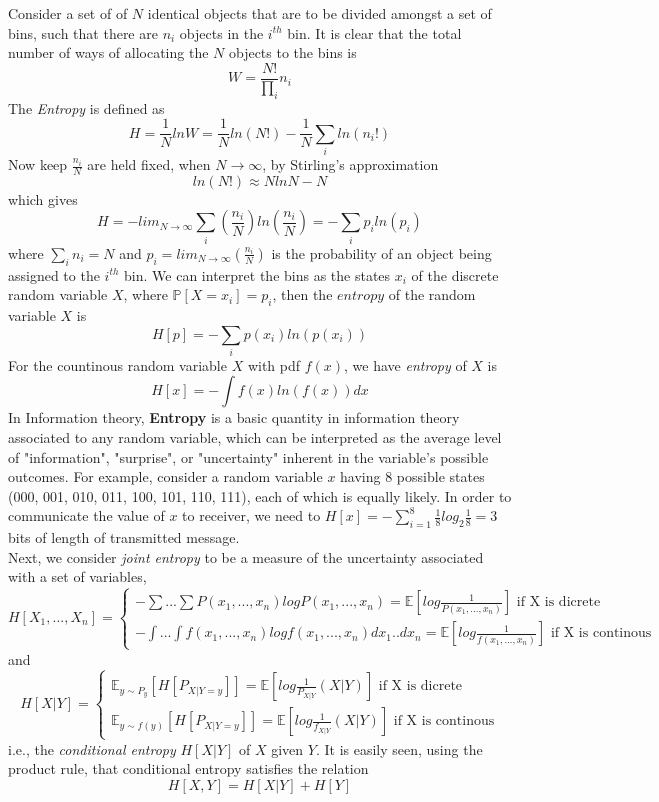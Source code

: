 \documentclass[10pt]{article}
\begin{document}
Consider a set of of $N$ identical objects that are to be divided amongst a set of bins, such that there are $n_i$ objects in the $i^{th}$ bin. It is clear that the total number of ways of allocating the $N$ objects to the bins is
\[ W = \frac{N!}{\prod_{i}}n_i \]
The \textit{Entropy} is defined as
\[ H = \frac{1}{N}lnW = \frac{1}{N}ln(N!) - \frac{1}{N}\sum_{i}ln(n_i!) \]
Now keep $\frac{n_i}{N}$ are held fixed, when $N \rightarrow \infty$, by Stirling's approximation
\[ ln(N!) \approx NlnN - N \]
which gives
\[ H = -lim_{N \rightarrow \infty} \sum_{i}(\frac{n_i}{N})ln(\frac{n_i}{N}) = -\sum_{i}p_iln(p_i) \]
where $\sum_{i}n_i = N$ and $p_i = lim_{N \rightarrow \infty}(\frac{n_i}{N})$ is the probability of an object being assigned to the $i^{th}$ bin. We can interpret the bins as the states $x_i$ of the discrete random variable $X$, where $\mathbb{P}[X=x_i]=p_i$, then the $entropy$ of the random variable $X$ is
\[H[p]=-\sum_{i}p(x_i)ln(p(x_i)) \]
For the countinous random variable $X$ with pdf $f(x)$, we have \textit{entropy} of $X$ is 
\[H[x] = - \int f(x)ln(f(x))dx \]
In Information theory, \textbf{Entropy} is a basic quantity in information theory associated to any random variable, which can be interpreted as the average level of "information", "surprise", or "uncertainty" inherent in the variable's possible outcomes. For example, consider a random variable $x$ having 8 possible states (000, 001, 010, 011, 100, 101, 110, 111), each of which is equally likely. In order to communicate the value of $x$ to receiver, we need to $H[x]=-\sum_{i=1}^{8}\frac{1}{8} log_{2}\frac{1}{8} =3 $ bits of length of transmitted message.\\ 
Next, we consider \textit{joint entropy} to be a measure of the uncertainty associated with a set of variables,
\[ H[X_1,...,X_n] = \begin{cases} -\sum ...\sum P(x_1,...,x_n)logP(x_1,...,x_n)= \mathbb{E}[log\frac{1}{P(x_1,...,x_n)}]  \text{       if X is dicrete}\\ -\int ...\int f(x_1,...,x_n)logf(x_1,...,x_n)dx_1..dx_n = \mathbb{E}[log\frac{1}{f(x_1,...,x_n)}] \text{       if X is continous} \end{cases}  \]
and
\[ H[X|Y] = \begin{cases} \mathbb{E}_{y \sim P_y}[H[P_{X|Y=y}]]= \mathbb{E}[log\frac{1}{P_{X|Y}}(X|Y)]  \text{       if X is dicrete}\\ \mathbb{E}_{y \sim f(y)}[H[P_{X|Y=y}]]= \mathbb{E}[log\frac{1}{f_{X|Y}}(X|Y)] \text{       if X is continous} \end{cases}  \]
i.e., the \textit{conditional entropy} $H[X|Y]$ of $X$ given $Y$. It is easily seen, using the product rule, that conditional entropy satisfies the relation
\[H[X,Y] = H[X|Y] + H[Y] \]
\end{document}
